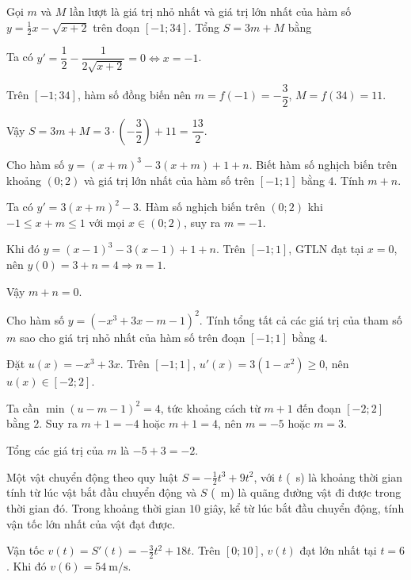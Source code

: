\begin{baitap}
	Gọi $m$ và $M$ lần lượt là giá trị nhỏ nhất và giá trị lớn nhất của hàm số $y = \frac{1}{2}x - \sqrt{x+2}$ trên đoạn $[-1; 34]$. Tổng $S = 3m + M$ bằng
	
	\begin{traloi}
		Ta có \(y'=\dfrac12-\dfrac{1}{2\sqrt{x+2}}=0\iff x=-1\).
		
		Trên \([-1;34]\), hàm số đồng biến nên \(m=f(-1)=-\dfrac32\), \(M=f(34)=11\).
		
		Vậy \(S=3m+M=3\cdot\left(-\dfrac32\right)+11=\dfrac{13}{2}\).
	\end{traloi}
\end{baitap}

\begin{baitap}
	Cho hàm số $y = (x+m)^3 - 3(x+m) + 1 + n$. Biết hàm số nghịch biến trên khoảng $(0; 2)$ và giá trị lớn nhất của hàm số trên $[-1; 1]$ bằng $4$. Tính $m+n$.
	\begin{traloi}
		\dapan{0}
		Ta có \(y'=3(x+m)^2-3\). Hàm số nghịch biến trên \((0;2)\) khi \(-1\le x+m\le1\) với mọi \(x\in(0;2)\), suy ra \(m=-1\).
		
		Khi đó \(y=(x-1)^3-3(x-1)+1+n\). Trên \([-1;1]\), GTLN đạt tại \(x=0\), nên \(y(0)=3+n=4\Rightarrow n=1\).
		
		Vậy \(m+n=0\).
	\end{traloi}
\end{baitap}

\begin{baitap}
	Cho hàm số $y = (-x^3 + 3x - m - 1)^2$. Tính tổng tất cả các giá trị của tham số $m$ sao cho giá trị nhỏ nhất của hàm số trên đoạn $[-1; 1]$ bằng $4$.
	\begin{traloi}
		\dapan{$ -2 $}
		
		Đặt \(u(x)=-x^3+3x\). Trên \([-1;1]\), \(u'(x)=3(1-x^2)\ge0\), nên \(u(x)\in[-2;2]\).
		
		Ta cần \(\min (u-m-1)^2=4\), tức khoảng cách từ \(m+1\) đến đoạn \([-2;2]\) bằng \(2\). Suy ra \(m+1=-4\) hoặc \(m+1=4\), nên \(m=-5\) hoặc \(m=3\).
		
		Tổng các giá trị của \(m\) là \(-5+3=-2\).
	\end{traloi}
\end{baitap}

\begin{baitap}
	Một vật chuyển động theo quy luật $S = -\frac{1}{2}t^3 + 9t^2$, với $t$ (\SI{}{\second}) là khoảng thời gian tính từ lúc vật bắt đầu chuyển động và $S$ (\SI{}{\meter}) là quãng đường vật đi được trong thời gian đó. Trong khoảng thời gian $10$ giây, kể từ lúc bắt đầu chuyển động, tính vận tốc lớn nhất của vật đạt được.
	\begin{traloi}
		\dapan{54}
		
		Vận tốc \(v(t)=S'(t)=-\frac{3}{2}t^2+18t\). Trên \([0;10]\), \(v(t)\) đạt lớn nhất tại \(t=6\). Khi đó \(v(6)=54\ \si{\meter/\second}\).
	\end{traloi}
\end{baitap}

